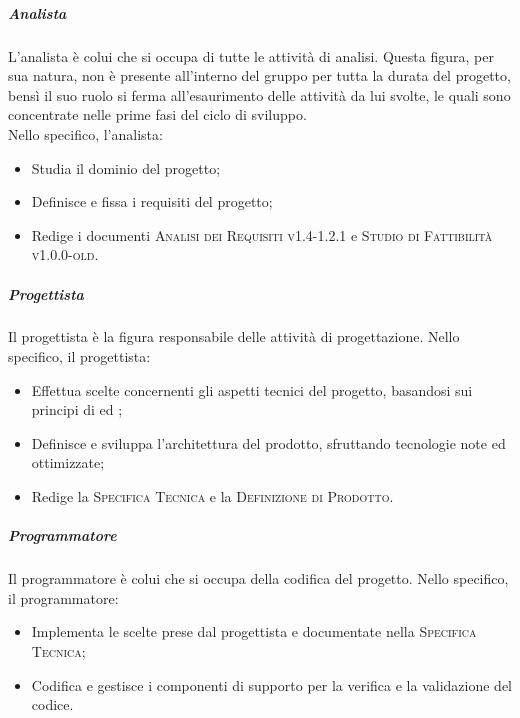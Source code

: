 \documentclass[../norme-di-progetto.tex]{subfiles}
\begin{document}
\subparagraph{Analista}
L'analista è colui che si occupa di tutte le attività di analisi. Questa figura, per sua natura, non è presente all'interno del gruppo per tutta la durata del progetto, bensì il suo ruolo si ferma all'esaurimento delle attività da lui svolte, le quali sono concentrate nelle prime fasi del ciclo di sviluppo. \\
Nello specifico, l'analista:
\begin{itemize}
  \item Studia il dominio del progetto;
  \item Definisce e fissa i requisiti del progetto;
  \item Redige i documenti \textsc{Analisi dei Requisiti v1.4-1.2.1} e \textsc{Studio di Fattibilità v1.0.0-old}.
\end{itemize}

\subparagraph{Progettista}
Il progettista è la figura responsabile delle attività di progettazione. Nello specifico, il progettista:
\begin{itemize}
  \item Effettua scelte concernenti gli aspetti tecnici del progetto, basandosi sui principi di  ed ;
  \item Definisce e sviluppa l'architettura del prodotto, sfruttando tecnologie note ed ottimizzate;
  \item Redige la \textsc{Specifica Tecnica} e la \textsc{Definizione di Prodotto}.
\end{itemize}

\subparagraph{Programmatore}
Il programmatore è colui che si occupa della codifica del progetto. Nello specifico, il programmatore:
\begin{itemize}
  \item Implementa le scelte prese dal progettista e documentate nella \textsc{Specifica Tecnica};
  \item Codifica e gestisce i componenti di supporto per la verifica e la validazione del codice.
\end{itemize}
\end{document}
